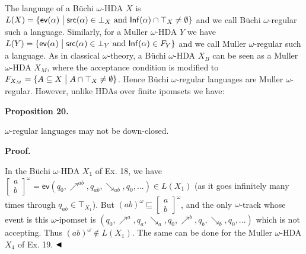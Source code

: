 \documentclass[10pt,a4paper]{article}
\begin{document}
The language of a Büchi $\omega$-HDA $X$ is $L(X)={\{\mathsf{ev}(\alpha)\mathrel{\big{|}}\mathsf{src}(\alpha)\in\bot_{X}\text{ and }\mathsf{Inf}(\alpha)\cap\top_{X}\neq\emptyset\}}$ and we call Büchi $\omega$-regular such a language. Similarly, for a Muller $\omega$-HDA $Y$ we have ${L(Y)={\{\mathsf{ev}(\alpha)\mathrel{\big{|}}\mathsf{src}(\alpha)\in\bot_{Y}\text{ and }\mathsf{Inf}(\alpha)\in F_{Y}\}}}$ and we call Muller $\omega$-regular such a language. As in classical $\omega$-theory, a Büchi $\omega$-HDA $X_{B}$ can be seen as a Muller $\omega$-HDA $X_{M}$, where the acceptance condition is modified to $F_{X_{M}}={\{A\subseteq X\mathrel{\big{|}}A\cap\top_{X}\neq\emptyset\}}$. Hence Büchi $\omega$-regular languages are Muller $\omega$-regular. However, unlike HDAs over finite ipomsets we have:\par
 
 
 
\par\medskip\noindent\textbf{Proposition 20.}\par
 
 
$\omega$-regular languages may not be down-closed.\par
 
 
 
 
\par\medskip\noindent\textbf{Proof.}\par
 
 
In the Büchi $\omega$-HDA $X_{1}$ of Ex. 18, we have $\left[\begin{smallmatrix}a\\
b\end{smallmatrix}\right]^{\omega}=\mathsf{ev}(q_{0},\mathrel{\nearrow^{ab}},q_{ab},\mathrel{\searrow_{ab}},q_{0},...)\in L(X_{1})$ (as it goes infinitely many times through $q_{ab}\in\top_{X_{1}}$). But $(ab)^{\omega}\sqsubseteq\left[\begin{smallmatrix}a\\
b\end{smallmatrix}\right]^{\omega}$, and the only $\omega$-track whose event is this $\omega$-ipomset is $(q_{0},\mathrel{\nearrow^{a}},q_{a},\mathrel{\searrow_{a}},q_{0},\mathrel{\nearrow^{b}},q_{b},\mathrel{\searrow_{b}},q_{0},...)$ which is not accepting. Thus $(ab)^{\omega}\not\in L(X_{1})$. The same can be done for the Muller $\omega$-HDA $X_{4}$ of Ex. 19. $\hfill\blacktriangleleft$\par
 
\end{document}
